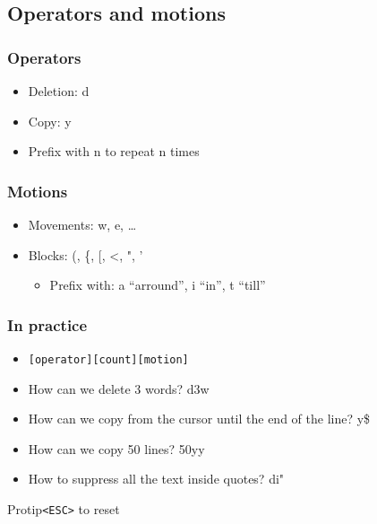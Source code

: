 \documentclass{beamer}
\begin{document}
\subsection{Operators and motions}
\begin{frame} \frametitle{Operators}
  \begin{itemize}
    \item Deletion: d
    \item Copy: y
    \item Prefix with n to repeat n times
  \end{itemize}
\end{frame}
\begin{frame} \frametitle{Motions}
  \begin{itemize}
    \item Movements: w, e, \dots
    \item Blocks: (, \{, [, \textless, ", '
    \begin{itemize}
      \item Prefix with: a ``arround'', i ``in'', t ``till''
    \end{itemize}
  \end{itemize}
\end{frame}
\begin{frame}[fragile] \frametitle{In practice}
  \begin{itemize}
    \item \begin{verbatim}[operator][count][motion]\end{verbatim}
  \end{itemize}
  \begin{itemize}
    \item \pause How can we delete 3 words? \pause d3w
    \item \pause How can we copy from the cursor until the end of the line? \pause y\$
    \item \pause How can we copy 50 lines? \pause 50yy
    \item \pause How to suppress all the text inside quotes? \pause di"
  \end{itemize}
  \pause
  \begin{exampleblock}{Protip}{\tt <ESC>} to reset\end{exampleblock}
\end{frame}
\end{document}
